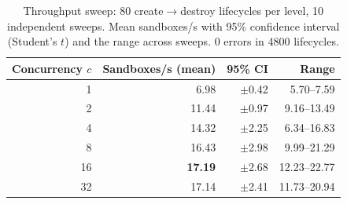 \begin{table}[t]
\centering
\caption{Throughput sweep: 80 create$\rightarrow$destroy lifecycles per level, 10 independent sweeps. Mean sandboxes/s with 95\% confidence interval (Student's $t$) and the range across sweeps. 0 errors in 4800 lifecycles.}
\label{tab:throughput}
\footnotesize
\begin{tabular}{@{}rrrr@{}}
\toprule
Concurrency $c$ & Sandboxes/s (mean) & 95\% CI & Range \\
\midrule
1 & {6.98} & $\pm$0.42 & 5.70--7.59 \\
2 & {11.44} & $\pm$0.97 & 9.16--13.49 \\
4 & {14.32} & $\pm$2.25 & 6.34--16.83 \\
8 & {16.43} & $\pm$2.98 & 9.99--21.29 \\
16 & \textbf{17.19} & $\pm$2.68 & 12.23--22.77 \\
32 & {17.14} & $\pm$2.41 & 11.73--20.94 \\
\bottomrule
\end{tabular}
\end{table}
